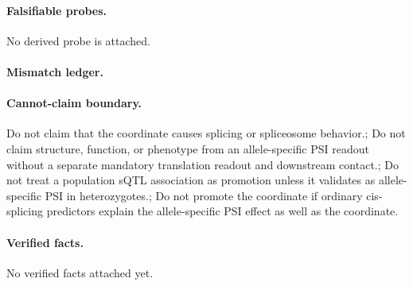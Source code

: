 \paragraph{Falsifiable probes.}
No derived probe is attached.

\paragraph{Mismatch ledger.}
\paragraph{Cannot-claim boundary.} Do not claim that the coordinate causes splicing or spliceosome behavior.; Do not claim structure, function, or phenotype from an allele-specific PSI readout without a separate mandatory translation readout and downstream contact.; Do not treat a population sQTL association as promotion unless it validates as allele-specific PSI in heterozygotes.; Do not promote the coordinate if ordinary cis-splicing predictors explain the allele-specific PSI effect as well as the coordinate.

\paragraph{Verified facts.}
No verified facts attached yet.
